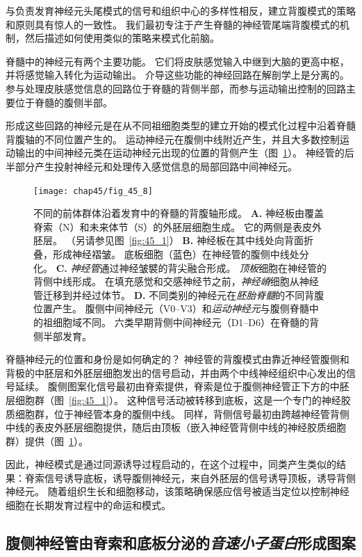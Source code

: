 与负责发育神经元头尾模式的信号和组织中心的多样性相反，建立背腹模式的策略和原则具有惊人的一致性。
我们最初专注于产生脊髓的神经管尾端背腹模式的机制，然后描述如何使用类似的策略来模式化前脑。


脊髓中的神经元有两个主要功能。
它们将皮肤感觉输入中继到大脑的更高中枢，并将感觉输入转化为运动输出。
介导这些功能的神经回路在解剖学上是分离的。
参与处理皮肤感觉信息的回路位于脊髓的背侧半部，而参与运动输出控制的回路主要位于脊髓的腹侧半部。


形成这些回路的神经元是在从不同祖细胞类型的建立开始的模式化过程中沿着脊髓背腹轴的不同位置产生的。
运动神经元在腹侧中线附近产生，并且大多数控制运动输出的中间神经元类在运动神经元出现的位置的背侧产生（图~\ref{fig:45_8}）。
神经管的后半部分产生投射神经元和处理传入感觉信息的局部回路中间神经元。


\begin{figure}[htbp]
	\centering
	\texttt{[image: chap45/fig\_45\_8]}
	\caption{不同的前体群体沿着发育中的脊髓的背腹轴形成。
		\textbf{A.} 神经板由覆盖脊索（N）和未来体节（S）的外胚层细胞生成。
		它的两侧是表皮外胚层。 （另请参见图~\ref{fig:45_1}） 
		\textbf{B.} 神经板在其中线处向背面折叠，形成神经褶皱。
		底板细胞（蓝色）在神经管的腹侧中线处分化。
		\textbf{C.} \textit{神经管}通过神经皱襞的背尖融合形成。
		\textit{顶板}细胞在神经管的背侧中线形成。
		在填充感觉和交感神经节之前，\textit{神经嵴}细胞从神经管迁移到并经过体节。
		\textbf{D.} 不同类别的神经元在\textit{胚胎脊髓}的不同背腹位置产生。
		腹侧中间神经元（V0–V3）和\textit{运动神经元}与腹侧脊髓中的祖细胞域不同。
		六类早期背侧中间神经元（D1–D6）在脊髓的背侧半部发育\cite{goulding2002formation}。}
	\label{fig:45_8}
\end{figure}


脊髓神经元的位置和身份是如何确定的？
神经管的背腹模式由靠近神经管腹侧和背极的中胚层和外胚层细胞发出的信号启动，并由两个中线神经组织中心发出的信号延续。
腹侧图案化信号最初由脊索提供，脊索是位于腹侧神经管正下方的中胚层细胞群（图~\ref{fig:45_1}）。
这种信号活动被转移到底板，这是一个专门的神经胶质细胞群，位于神经管本身的腹侧中线。
同样，背侧信号最初由跨越神经管背侧中线的表皮外胚层细胞提供，随后由顶板（嵌入神经管背侧中线的神经胶质细胞群）提供（图~\ref{fig:45_8}）。


因此，神经模式是通过同源诱导过程启动的，在这个过程中，同类产生类似的结果：脊索信号诱导底板，诱导腹侧神经元，来自外胚层的信号诱导顶板，诱导背侧神经元。
随着组织生长和细胞移动，该策略确保感应信号被适当定位以控制神经细胞在长期发育过程中的命运和模式。



\subsection{腹侧神经管由脊索和底板分泌的\textit{音速小子蛋白}形成图案}

